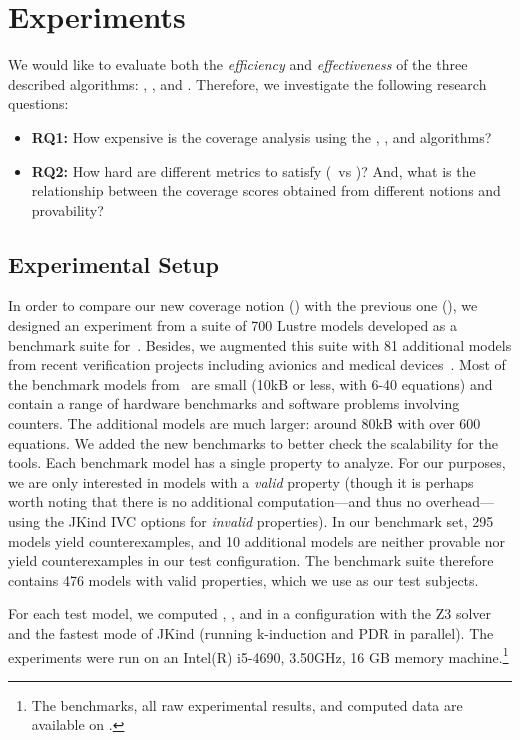 \section{Experiments}
\label{sec:experiments}

We would like to evaluate both the {\em efficiency} and {\em
  effectiveness} of the three described algorithms: \ucbfalg, \ucalg, and \mustalg. Therefore, we investigate the following research questions:
\begin{itemize}
    \item \textbf{RQ1:} How expensive is the coverage analysis using the \ucalg, \mustalg, and \ucbfalg algorithms?
    \item \textbf{RQ2:} How hard are different metrics to satisfy (\ivccov\ vs \nondetcov)?  And, what is the relationship between the coverage scores obtained from different notions and provability?
\end{itemize}

\subsection{Experimental Setup}

In order to compare our new coverage notion (\ivccov) with the previous one (\nondetcov), we designed an experiment from a suite of 700 Lustre models developed
as a benchmark suite for~\cite{Hagen08:FMCAD}. Besides, we augmented this suite
with 81 additional models from recent verification projects including
avionics and medical devices~\cite{QFCS15:backes,hilt2013}. Most of
the benchmark models from~\cite{Hagen08:FMCAD} are small (10kB or less,
with 6-40 equations) and contain a range of hardware benchmarks and
software problems involving counters. The additional models are much
larger: around 80kB with over 600 equations. We added the new
benchmarks to better check the scalability for the tools. Each benchmark model has a single property to analyze.  For our purposes, we are only interested in models with a {\em valid} property (though it is perhaps worth noting that there is no additional computation---and thus no overhead---using the JKind IVC options for {\em invalid} properties).  In our benchmark set, 295 models yield counterexamples, and 10 additional models are neither provable nor yield counterexamples in our test configuration.  The benchmark suite therefore contains 476 models with valid properties, which we use as our test subjects.

For each test model, we computed \ucalg, \ucbfalg, and \mustalg in a configuration with
the Z3 solver and the fastest mode of JKind (running k-induction and PDR in parallel). The experiments
were run on an  Intel(R) i5-4690, 3.50GHz,
16 GB memory machine.\footnote{The benchmarks, all raw experimental results,
  and computed data are available on \cite{expr}.}
  

  

